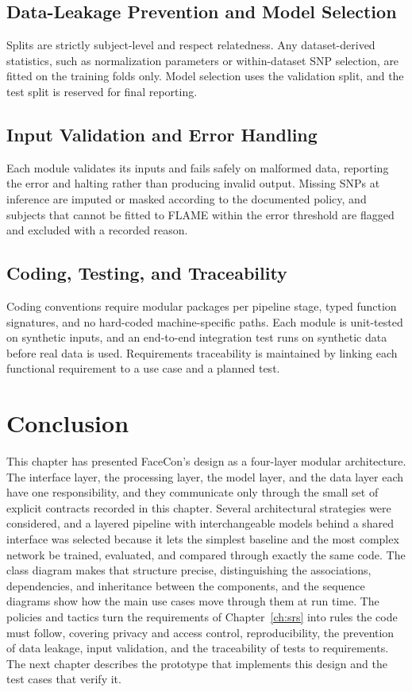 \subsection{Data-Leakage Prevention and Model Selection}
Splits are strictly subject-level and respect relatedness. Any dataset-derived statistics, such as normalization parameters or within-dataset SNP selection, are fitted on the training folds only. Model selection uses the validation split, and the test split is reserved for final reporting.

\subsection{Input Validation and Error Handling}
Each module validates its inputs and fails safely on malformed data, reporting the error and halting rather than producing invalid output. Missing SNPs at inference are imputed or masked according to the documented policy, and subjects that cannot be fitted to FLAME within the error threshold are flagged and excluded with a recorded reason.

\subsection{Coding, Testing, and Traceability}
Coding conventions require modular packages per pipeline stage, typed function signatures, and no hard-coded machine-specific paths. Each module is unit-tested on synthetic inputs, and an end-to-end integration test runs on synthetic data before real data is used. Requirements traceability is maintained by linking each functional requirement to a use case and a planned test.

\section{Conclusion}
This chapter has presented FaceCon's design as a four-layer modular architecture. The interface layer, the processing layer, the model layer, and the data layer each have one responsibility, and they communicate only through the small set of explicit contracts recorded in this chapter. Several architectural strategies were considered, and a layered pipeline with interchangeable models behind a shared interface was selected because it lets the simplest baseline and the most complex network be trained, evaluated, and compared through exactly the same code. The class diagram makes that structure precise, distinguishing the associations, dependencies, and inheritance between the components, and the sequence diagrams show how the main use cases move through them at run time. The policies and tactics turn the requirements of Chapter~\ref{ch:srs} into rules the code must follow, covering privacy and access control, reproducibility, the prevention of data leakage, input validation, and the traceability of tests to requirements. The next chapter describes the prototype that implements this design and the test cases that verify it.
